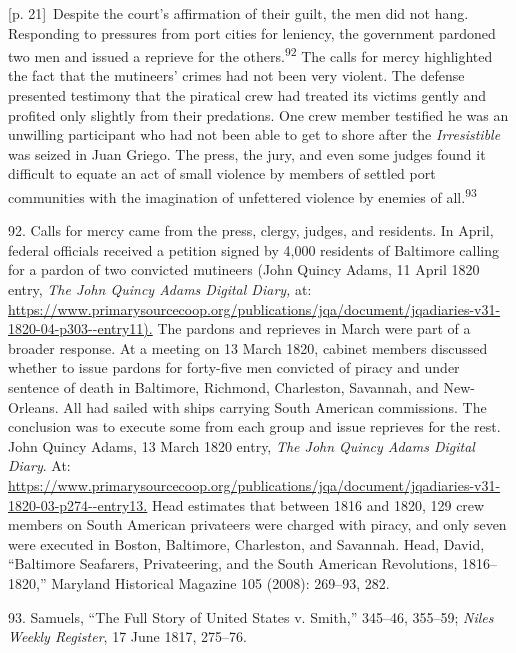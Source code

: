 \documentclass[10pt,a4paper]{article}
\begin{document}
{\scriptsize\color{gray} [p. 21]}\ Despite the court’s affirmation of their guilt, the men did not hang. Responding to pressures from port cities for leniency, the government pardoned two men and issued a reprieve for the others.\nobreak\textsuperscript{92} The calls for mercy highlighted the fact that the mutineers’ crimes had not been very violent. The defense presented testimony that the piratical crew had treated its victims gently and profited only slightly from their predations. One crew member testified he was an unwilling participant who had not been able to get to shore after the \textit{Irresistible} was seized in Juan Griego. The press, the jury, and even some judges found it difficult to equate an act of small violence by members of settled port communities with the imagination of unfettered violence by enemies of all.\nobreak\textsuperscript{93}\par{\small 92. Calls for mercy came from the press, clergy, judges, and residents. In April, federal officials received a petition signed by 4,000 residents of Baltimore calling for a pardon of two convicted mutineers (John Quincy Adams, 11 April 1820 entry, \textit{The John Quincy Adams Digital Diary,} at: \url{https://www.primarysourcecoop.org/publications/jqa/document/jqadiaries-v31-1820-04-p303--entry11).} The pardons and reprieves in March were part of a broader response. At a meeting on 13 March 1820, cabinet members discussed whether to issue pardons for forty-five men convicted of piracy and under sentence of death in Baltimore, Richmond, Charleston, Savannah, and New-Orleans. All had sailed with ships carrying South American commissions. The conclusion was to execute some from each group and issue reprieves for the rest. John Quincy Adams, 13 March 1820 entry, \textit{The John Quincy Adams Digital Diary}. At: \url{https://www.primarysourcecoop.org/publications/jqa/document/jqadiaries-v31-1820-03-p274--entry13.} Head estimates that between 1816 and 1820, 129 crew members on South American privateers were charged with piracy, and only seven were executed in Boston, Baltimore, Charleston, and Savannah. Head, David, “Baltimore Seafarers, Privateering, and the South American Revolutions, 1816–1820,” Maryland Historical Magazine 105 (2008): 269–93, 282.\par}{\small 93. Samuels, “The Full Story of United States v. Smith,” 345–46, 355–59; \textit{Niles Weekly Register}, 17 June 1817, 275–76.\par}
\end{document}
